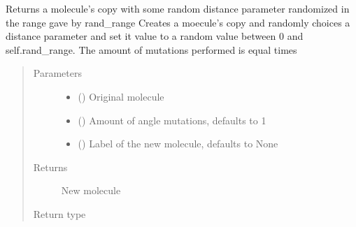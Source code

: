 \documentclass[letterpaper,10pt,english]{sphinxmanual}
\begin{document}

\begin{fulllineitems}
\label{\detokenize{molecular:molecular.mutate_distances}}
\sphinxAtStartPar
Returns a molecule’s copy with some random distance parameter randomized in the range gave by rand\_range
Creates a moecule’s copy and randomly choices a distance parameter and set it value to a random value between 0 and
self.rand\_range. The amount of mutations performed is equal times
\begin{quote}\begin{description}
\item[{Parameters}] \leavevmode\begin{itemize}
\item {} 
\sphinxAtStartPar
{} ({\hyperref[\detokenize{molecular:molecular.Molecule}]{}}) \textendash{} Original molecule

\item {} 
\sphinxAtStartPar
{} (\sphinxstyleliteralemphasis{\sphinxupquote{, }}) \textendash{} Amount of angle mutations, defaults to 1

\item {} 
\sphinxAtStartPar
{} (\sphinxstyleliteralemphasis{\sphinxupquote{, }}) \textendash{} Label of the new molecule, defaults to None

\end{itemize}

\item[{Returns}] \leavevmode
\sphinxAtStartPar
New molecule

\item[{Return type}] \leavevmode
\sphinxAtStartPar
{\hyperref[\detokenize{molecular:molecular.Molecule}]{}}

\end{description}\end{quote}

\end{fulllineitems}
\end{document}
